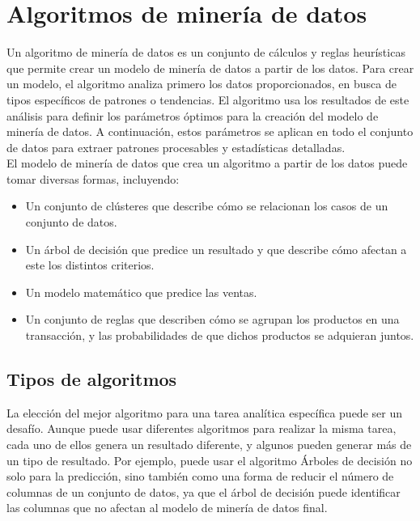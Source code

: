 \documentclass[a4paper, 11pt]{article} %
\begin{document}
\section*{Algoritmos de minería de datos}

Un algoritmo de minería de datos es un conjunto de cálculos y reglas heurísticas que permite crear un modelo de minería de datos a partir de los datos. Para crear un modelo, el algoritmo analiza primero los datos proporcionados, en busca de tipos específicos de patrones o tendencias. El algoritmo usa los resultados de este análisis para definir los parámetros óptimos para la creación del modelo de minería de datos. A continuación, estos parámetros se aplican en todo el conjunto de datos para extraer patrones procesables y estadísticas detalladas.\\

El modelo de minería de datos que crea un algoritmo a partir de los datos puede tomar diversas formas, incluyendo:

\begin{itemize}
\item Un conjunto de clústeres que describe cómo se relacionan los casos de un conjunto de datos.
\item Un árbol de decisión que predice un resultado y que describe cómo afectan a este los distintos criterios.
\item Un modelo matemático que predice las ventas.
\item Un conjunto de reglas que describen cómo se agrupan los productos en una transacción, y las probabilidades de que dichos productos se adquieran juntos.
\end{itemize}

\subsection*{Tipos de algoritmos}

La elección del mejor algoritmo para una tarea analítica específica puede ser un desafío. Aunque puede usar diferentes algoritmos para realizar la misma tarea, cada uno de ellos genera un resultado diferente, y algunos pueden generar más de un tipo de resultado. Por ejemplo, puede usar el algoritmo Árboles de decisión no solo para la predicción, sino también como una forma de reducir el número de columnas de un conjunto de datos, ya que el árbol de decisión puede identificar las columnas que no afectan al modelo de minería de datos final.\\
\end{document}
